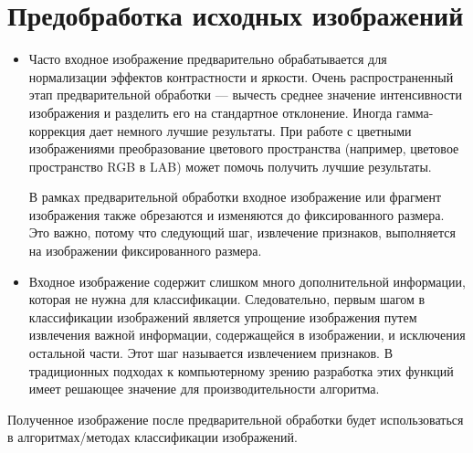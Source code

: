 \chapter{Предобработка исходных изображений}

\begin{itemize}
\item Часто входное изображение предварительно обрабатывается для нормализации эффектов контрастности и яркости. Очень распространенный этап предварительной обработки — вычесть среднее значение интенсивности изображения и разделить его на стандартное отклонение. Иногда гамма-коррекция дает немного лучшие результаты. При работе с цветными изображениями преобразование цветового пространства (например, цветовое пространство RGB в LAB) может помочь получить лучшие результаты.

В рамках предварительной обработки входное изображение или фрагмент изображения также обрезаются и изменяются до фиксированного размера. Это важно, потому что следующий шаг, извлечение признаков, выполняется на изображении фиксированного размера.

\item Входное изображение содержит слишком много дополнительной информации, которая не нужна для классификации. Следовательно, первым шагом в классификации изображений является упрощение изображения путем извлечения важной информации, содержащейся в изображении, и исключения остальной части.  Этот шаг называется извлечением признаков. В традиционных подходах к компьютерному зрению разработка этих функций имеет решающее значение для производительности алгоритма. 
\end{itemize}

Полученное изображение после предварительной обработки будет использоваться в алгоритмах/методах классификации изображений.
